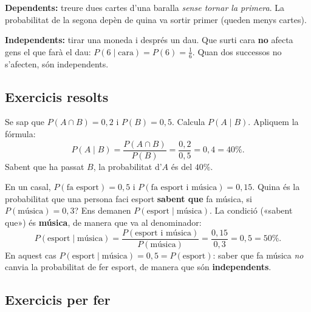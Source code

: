 \begin{exemple}
\textbf{Dependents:} treure dues cartes d'una baralla \emph{sense tornar la primera}.
La probabilitat de la segona depèn de quina va sortir primer (queden menys cartes).

\textbf{Independents:} tirar una moneda i després un dau. Que surti cara \textbf{no}
afecta gens el que farà el dau: $P(\text{6}\mid\text{cara})=P(\text{6})=\frac{1}{6}$.
Quan dos successos no s'afecten, són independents.
\end{exemple}

\subsection{Exercicis resolts}

\begin{exresolt}
Se sap que $P(A\cap B)=0,2$ i $P(B)=0,5$. Calcula $P(A\mid B)$.
\solucio
Apliquem la fórmula:
\[
P(A\mid B)=\frac{P(A\cap B)}{P(B)}=\frac{0,2}{0,5}=0,4=40\%.
\]
Sabent que ha passat $B$, la probabilitat d'$A$ és del $40\%$.
\end{exresolt}

\begin{exresolt}
En un casal, $P(\text{fa esport})=0,5$ i $P(\text{fa esport i música})=0,15$. Quina és
la probabilitat que una persona faci esport \textbf{sabent que} fa música, si
$P(\text{música})=0,3$?
\solucio
Ens demanen $P(\text{esport}\mid\text{música})$. La condició («sabent que») és
\textbf{música}, de manera que va al denominador:
\[
P(\text{esport}\mid\text{música})=\frac{P(\text{esport i música})}{P(\text{música})}
=\frac{0,15}{0,3}=0,5=50\%.
\]
En aquest cas $P(\text{esport}\mid\text{música})=0,5=P(\text{esport})$: saber que fa
música \emph{no} canvia la probabilitat de fer esport, de manera que són
\textbf{independents}.
\end{exresolt}

\subsection{Exercicis per fer}

